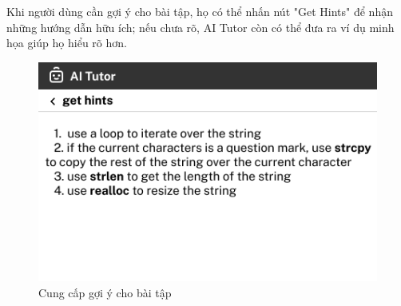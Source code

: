 Khi người dùng cần gợi ý cho bài tập, họ có thể nhấn nút "Get Hints" để nhận những hướng dẫn hữu ích; nếu chưa rõ, AI Tutor còn có thể đưa ra ví dụ minh họa giúp họ hiểu rõ hơn. 
\begin{figure}[H]
    \centering
    \includegraphics[width=0.7\linewidth]{Images/Anh/UI_AI_get_hints.png}
    \caption{Cung cấp gợi ý cho bài tập}
    \label{fig:enter-label}
\end{figure}
